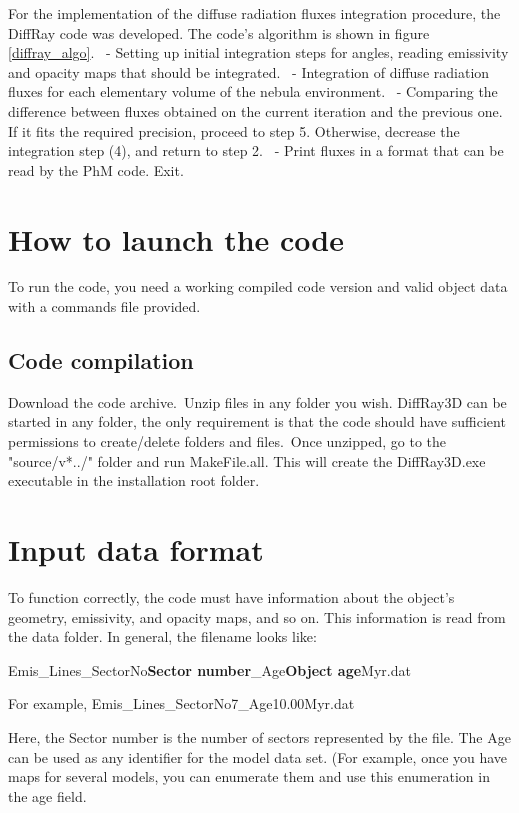 \documentclass[a4paper]{article}
\begin{document}
For the implementation of the diffuse radiation fluxes integration procedure, the DiffRay code was developed. The code's algorithm is shown in figure \ref{diffray_algo}.\
 - Setting up initial integration steps for angles, reading emissivity and opacity maps that should be integrated.\
 - Integration of diffuse radiation fluxes for each elementary volume of the nebula environment.\
 - Comparing the difference between fluxes obtained on the current iteration and the previous one. If it fits the required precision, proceed to step 5. Otherwise, decrease the integration step (4), and return to step 2.\
 - Print fluxes in a format that can be read by the PhM code. Exit.\

\section{How to launch the code}

To run the code, you need a working compiled code version and valid object data with a commands file provided.

\subsection{Code compilation}

Download the code archive.\
Unzip files in any folder you wish. DiffRay3D can be started in any folder, the only requirement is that the code should have sufficient permissions to create/delete folders and files.\
Once unzipped, go to the "source/v*../" folder and run MakeFile.all. This will create the DiffRay3D.exe executable in the installation root folder.\
\section{Input data format}
To function correctly, the code must have information about the object's geometry, emissivity, and opacity maps, and so on. This information is read from the data folder. In general, the filename looks like:

Emis\_Lines\_SectorNo{\bf Sector number}\_Age{\bf Object age}Myr.dat

For example, Emis\_Lines\_SectorNo7\_Age10.00Myr.dat

Here, the Sector number is the number of sectors represented by the file. The Age can be used as any identifier for the model data set. (For example, once you have maps for several models, you can enumerate them and use this enumeration in the age field.
\end{document}
